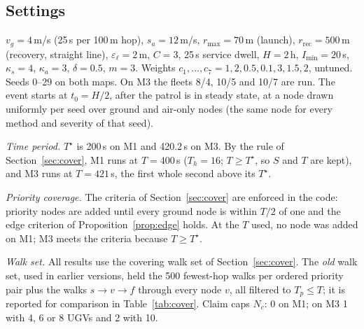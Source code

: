 \documentclass[11pt]{article}
\theoremstyle{definition}
\theoremstyle{plain}
\begin{document}
\subsection{Settings}
$v_g = 4$\,m/s (25\,s per 100\,m hop), $s_a = 12$\,m/s, $r_{\max} = 70$\,m
(launch), $r_{\mathrm{rec}} = 500$\,m (recovery, straight line), $\varepsilon_\ell = 2$\,m,
$C = 3$, 25\,s service dwell, $H = 2$\,h, $I_{\min} = 20$\,s, $\kappa_s = 4$,
$\kappa_a = 3$, $\delta = 0.5$, $m = 3$. Weights $c_1, \ldots, c_7 = 1, 2,
0.5, 0.1, 3, 1.5, 2$, untuned. Seeds 0--29 on both maps. On M3 the fleets 8/4, 10/5 and 10/7
are run. The event starts at $t_0 = H/2$, after the
patrol is in steady state, at a node drawn uniformly per seed over ground
and air-only nodes (the same node for every method and severity of that
seed).

\emph{Time period.} $T^\star$ is 200\,s on M1 and 420.2\,s on M3. By the
rule of Section~\ref{sec:cover}, M1 runs at $T = 400$\,s ($T_h = 16$;
$T \geq T^\star$, so $S$ and $T$ are kept), and M3 runs at $T = 421$\,s, the
first whole second above its $T^\star$.

\emph{Priority coverage.} The criteria of Section~\ref{sec:cover} are
enforced in the code: priority nodes are added until every ground node is
within $T/2$ of one and the edge criterion of Proposition~\ref{prop:edge}
holds. At the $T$ used, no node was added on M1; M3 meets the
criteria because $T \geq T^\star$.

\emph{Walk set.} All results use the covering walk set of
Section~\ref{sec:cover}. The \emph{old} walk set, used in earlier versions,
held the 500 fewest-hop walks per ordered priority pair plus the walks
$s \to v \to f$ through every node $v$, all filtered to $T_p \leq T$; it is
reported for comparison in Table~\ref{tab:cover}. Claim caps $N_c$: 0 on M1;
on M3 1 with 4, 6 or 8 UGVs and 2 with 10.
\end{document}
